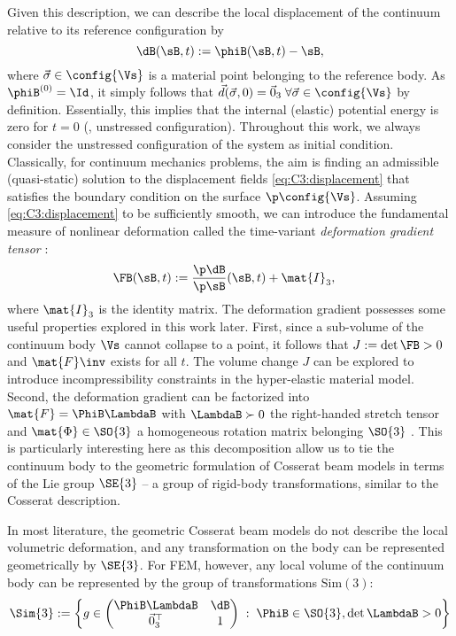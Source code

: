 Given this description, we can describe the local displacement of the continuum relative to its reference configuration by
%
\begin{equation}
\dB(\sB,t) := \phiB(\sB,t) - \sB,
\label{eq:C3:displacement}
\end{equation}
%
where $\vec{\sigma} \in \config{\Vs}$ is a material point belonging to the reference body. As $\phiB^{(0)} = \Id$, it simply follows that $\vec{d}(\vec{\sigma},0) = \vec{0}_{3} \; \forall \vec{\sigma} \in \config{\Vs}$ by definition. Essentially, this implies that the internal (elastic) potential energy is zero for $t = 0$ (\ie, unstressed configuration). Throughout this work, we always consider the unstressed configuration of the system as initial condition. Classically, for continuum mechanics problems, the aim is finding an admissible (quasi-static) solution to the displacement fields \eqref{eq:C3:displacement} that satisfies the boundary condition on the surface $\p \config{\Vs}$. Assuming \eqref{eq:C3:displacement} to be sufficiently smooth, we can introduce the fundamental measure of nonlinear deformation called the time-variant
\textit{deformation gradient tensor} \cite{Kim2018}:
%
\begin{align}
\FB(\sB,t)&:=\frac{\p\dB}{\p\sB}(\sB,t) +\mat{I}_3,
\label{eq:C3:deformationgradient}
\end{align}
%
where $\mat{I}_3$ is the identity matrix. The deformation gradient possesses some useful properties explored in this work later. First, since a sub-volume of the continuum body $\Vs$ cannot collapse to a point, it follows that $J := \det{\FB} > 0$ and $\mat{F}\inv$ exists for all $t$. The volume change $J$ can be explored to introduce incompressibility constraints in the hyper-elastic material model. Second, the deformation gradient can be factorized into $\mat{F} = \PhiB \LambdaB
$ with $\LambdaB \succ 0$ the right-handed stretch tensor and $\mat{\Phi} \in \SO{3}$ a homogeneous rotation matrix belonging $\SO{3}$ \cite{Kim2018,Smith2018}. This is particularly interesting here as this decomposition allow us to tie the continuum body to the geometric formulation of Cosserat beam models in terms of the Lie group $\SE{3}$ -- a group of rigid-body transformations, similar to the Cosserat description.

\begin{rmk}
In most literature, the geometric Cosserat beam models do not describe the local volumetric deformation, and any transformation on the body can be represented geometrically by $\SE{3}$. For FEM, however, any local volume of the continuum body can be represented by the group of transformations $\text{Sim}(3)$:
%
$$
\Sim{3} := \left\{ g \in \begin{pmatrix} \PhiB \LambdaB & \dB \\ \vec{0}^\top_3 & 1 \end{pmatrix} \; : \; \PhiB \in \SO{3}, \det{\LambdaB} > 0  \right\}
$$
%
\end{rmk}

